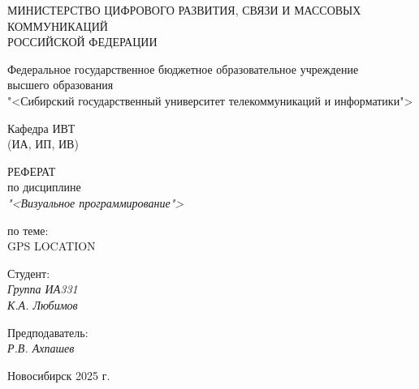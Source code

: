 \thispagestyle{empty}

\begin{center}
    МИНИСТЕРСТВО ЦИФРОВОГО РАЗВИТИЯ, СВЯЗИ И МАССОВЫХ КОММУНИКАЦИЙ \\ РОССИЙСКОЙ ФЕДЕРАЦИИ

    \vspace{20pt}

    Федеральное государственное бюджетное образовательное учреждение  \\  высшего образования \\
    "<Сибирский государственный университет телекоммуникаций и информатики"> \\

    \vspace{20pt}

    Кафедра ИВТ \\  (ИА, ИП, ИВ)
\end{center}

\vfill

\begin{center}
    РЕФЕРАТ \\  
    по дисциплине \\
    \textit{"<Визуальное программирование">}

    \vspace{20pt}

    по теме: \\
    \uppercase{Gps Location}
\end{center}

\vfill

    \noindent Студент: \\
    \textit{Группа ИА331 \\ К.А. Любимов}

    \vspace{20pt}

    \noindent Предподаватель: \\
    \textit{\hfill Р.В. Ахпашев}

\vfill

\begin{center}
    Новосибирск 2025 г.
\end{center}